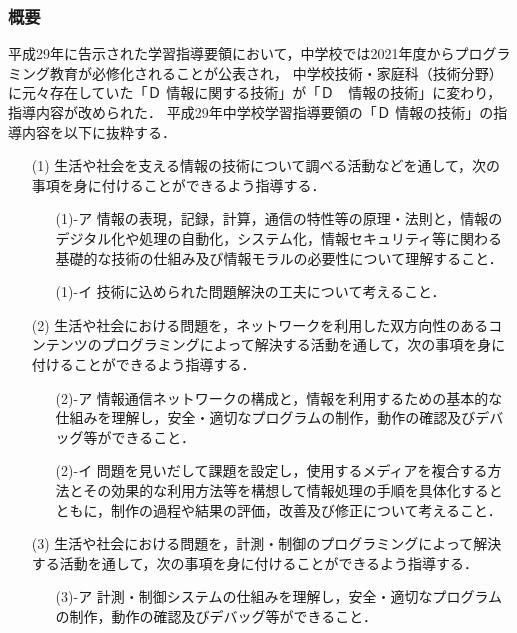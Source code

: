 \documentclass[12pt,a4j,titlepage]{ltjsarticle}
\begin{document}
\subsubsection{概要}
平成29年に告示された学習指導要領において，中学校では2021年度からプログラミング教育が必修化されることが公表され，
中学校技術・家庭科（技術分野）に元々存在していた「Ｄ 情報に関する技術」が「Ｄ　情報の技術」に変わり，指導内容が改められた\cite{tyugaku_29sidou}．
平成29年中学校学習指導要領の「Ｄ 情報の技術」の指導内容を以下に抜粋する．
\begin{enumerate}

\item[(1)] 生活や社会を支える情報の技術について調べる活動などを通して，次の事項を身に付けることができるよう指導する．
\begin{enumerate}
\item[(1)-ア] 情報の表現，記録，計算，通信の特性等の原理・法則と，情報のデジタル化や処理の自動化，システム化，情報セキュリティ等に関わる基礎的な技術の仕組み及び情報モラルの必要性について理解すること．

\item[(1)-イ] 技術に込められた問題解決の工夫について考えること．
\end{enumerate}

\item[(2)] 生活や社会における問題を，ネットワークを利用した双方向性のあるコンテンツのプログラミングによって解決する活動を通して，次の事項を身に付けることができるよう指導する．
\begin{enumerate}
\item[(2)-ア] 情報通信ネットワークの構成と，情報を利用するための基本的な仕組みを理解し，安全・適切なプログラムの制作，動作の確認及びデバッグ等ができること．

\item[(2)-イ] 問題を見いだして課題を設定し，使用するメディアを複合する方法とその効果的な利用方法等を構想して情報処理の手順を具体化するとともに，制作の過程や結果の評価，改善及び修正について考えること．
\end{enumerate}

\item[(3)] 生活や社会における問題を，計測・制御のプログラミングによって解決する活動を通して，次の事項を身に付けることができるよう指導する．
\begin{enumerate}
\item[(3)-ア] 計測・制御システムの仕組みを理解し，安全・適切なプログラムの制作，動作の確認及びデバッグ等ができること．


\end{enumerate}
\end{enumerate}
\end{document}
